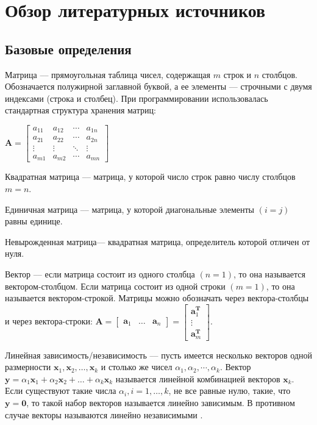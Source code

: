 \newpage

\section{Обзор литературных источников}

\subsection{Базовые определения}

Матрица \cite{MathBook} --– прямоугольная таблица чисел, содержащая $ m $ строк и $ n $ столбцов. Обозначается полужирной заглавной буквой, а ее элементы --- строчными с двумя индексами (строка и столбец). При программировании использовалась стандартная структура хранения матриц:

$ \mathbf{A} = \left[ 
\begin{array}{cccc}
a_{11} & a_{12} & \cdots & a_{1n} \\
a_{21} & a_{22} & \cdots & a_{2n} \\
\vdots & \vdots & \ddots & \vdots \\
a_{m1} & a_{m2} & \cdots & a_{mn}
\end{array} \right] $

Квадратная матрица –-- матрица, у которой число строк равно числу столбцов $ m = n $.

Единичная матрица --– матрица, у которой диагональные элементы $ (i = j) $ равны единице.

Невырожденная матрица--– квадратная матрица, определитель которой отличен от нуля.

Вектор –-- если матрица состоит из одного столбца $ (n = 1) $, то она называется вектором-столбцом. Если матрица состоит из одной строки $ (m = 1) $, то она называется вектором-строкой. Матрицы можно обозначать через вектора-столбцы и через вектора-строки: $ \mathbf{A} = \left[ \begin{array}{cccc}
\mathbf{a}_1 & \ldots & \mathbf{a}_n 
\end{array} \right] = \left[ \begin{array}{cccc}
\mathbf{a}^\mathbf{T}_1 \\
\vdots \\
\mathbf{a}^\mathbf{T}_m
\end{array} \right] $.

Линейная зависимость/независимость –-- пусть имеется несколько векторов одной размерности $ \mathbf{x}_1, \mathbf{x}_2, \ldots ,\mathbf{x}_k $ и столько же чисел $ \alpha_1, \alpha_2, \cdots, \alpha_k $. Вектор $ \mathbf{y}=\alpha_1 \mathbf{x}_1 + \alpha_2 \mathbf{x}_2 + \ldots + \alpha_k \mathbf{x}_k $ называется линейной комбинацией векторов $ \mathbf{x}_k $. Если существуют такие числа $ \alpha_i, i=1, \ldots, k $, не все равные нулю, такие, что $ \mathbf{y}=\mathbf{0} $, то такой набор векторов называется линейно зависимым. В противном случае векторы называются линейно независимыми \cite{MathBook}.

